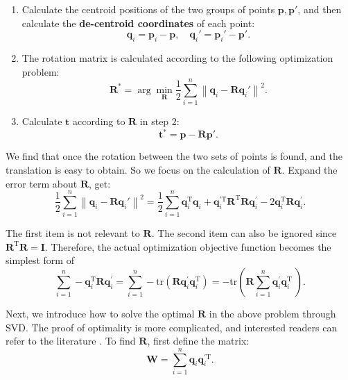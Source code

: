 \begin{mdframed}
\begin{enumerate}
	\item Calculate the centroid positions of the two groups of points $\bm{p}, \bm{p}'$, and then calculate the \textbf{de-centroid coordinates} of each point:
	\[
	\bm{q}_i = \bm{p}_i - \bm{p}, \quad \bm{q}_i' = \bm{p}_i' - \bm{p}'.
	\]
	\item The rotation matrix is calculated according to the following optimization problem:
	\begin{equation}
		\bm{R}^* = \arg \mathop {\min }\limits_{\bm{R}} \frac{1}{2}\sum\limits_{i = 1}^n {{\left\| {{\bm{q}_i} - \bm{R} \bm{q}_i' } \right\|}^2}.
	\end{equation}
	\item Calculate $\bm{t}$ according to $\bm{R}$ in step 2:
	\begin{equation}
	\label{eq:pnp-solve-t}
	\bm{t}^* = \bm{p} - \bm{R} \bm{p}'.
	\end{equation}
\end{enumerate}
\end{mdframed}

We find that once the rotation between the two sets of points is found, and the translation is easy to obtain. So we focus on the calculation of $\bm{R}$. Expand the error term about $\bm{R}$, get:
\begin{equation}
 \frac{1}{2}\sum\limits_{i = 1}^n \left\| {{\bm{q}_i} - \bm{R} \bm{q}_i' } \right\|^2 = \frac{1}{2}\sum\limits_{i = 1}^n \bm{q}_i^\mathrm{T} \bm{q}_i + \bm{q}_i^{ \prime \mathrm{T}}  \bm{R}^\mathrm{T} \bm{R} \bm{q}^\prime_i - 2\bm{q}_i^\mathrm{T} \bm{R} \bm{q}^\prime_i.
\end{equation}

The first item is not relevant to $\bm{R}$. The second item can also be ignored since $\bm{R}^\mathrm{T}\bm{R}=\bm{I}$. Therefore, the actual optimization objective function becomes the simplest form of
\begin{equation}
\sum\limits_{i = 1}^n - \bm{q}_i^\mathrm{T} \bm{R} \bm{q}^\prime_i = \sum\limits_{i = 1}^n -\mathrm{tr} \left( \bm{R} \bm{q}_i^{\prime} \bm{q}^{\mathrm{T}}_i \right) = - \mathrm{tr} \left( \bm{R} \sum\limits_{i = 1}^n \bm{q}_i^{\prime} \bm{q}^{\mathrm{T}}_i \ \right).
\end{equation}

Next, we introduce how to solve the optimal $\bm{R}$ in the above problem through SVD. The proof of optimality is more complicated, and interested readers can refer to the literature \cite{Arun1987, PomerleauColasSiegwart2015}. To find $\bm{R}$, first define the matrix:
\begin{equation}
\bm{W} =  \sum\limits_{i = 1}^n \bm{q}_i \bm{q}^{\prime \mathrm{T}}_i.
\end{equation}

